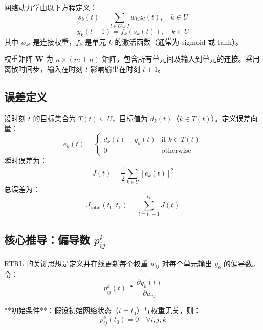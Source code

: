 \documentclass{article}
\begin{document}
网络动力学由以下方程定义：
\begin{equation}
s_k(t) = \sum_{l \in U \cup I} w_{kl} z_l(t), \quad k \in U
\label{eq:rtrl_net}
\end{equation}
\begin{equation}
y_k(t+1) = f_k(s_k(t)), \quad k \in U
\label{eq:rtrl_fire}
\end{equation}
其中 $w_{kl}$ 是连接权重，$f_k$ 是单元 $k$ 的激活函数（通常为 sigmoid 或 tanh）。

权重矩阵 $\mathbf{W}$ 为 $n \times (m+n)$ 矩阵，包含所有单元间及输入到单元的连接。采用离散时间步，输入在时刻 $t$ 影响输出在时刻 $t+1$。

\subsection{误差定义}

设时刻 $t$ 的目标集合为 $T(t) \subseteq U$，目标值为 $d_k(t)$（$k \in T(t)$）。定义误差向量：
\begin{equation}
e_k(t) = 
\begin{cases}
d_k(t) - y_k(t) & \text{if } k \in T(t) \\
0 & \text{otherwise}
\end{cases}
\label{eq:rtrl_error}
\end{equation}
瞬时误差为：
\begin{equation}
J(t) = \frac{1}{2} \sum_{k \in U} [e_k(t)]^2
\label{eq:rtrl_inst_loss}
\end{equation}
总误差为：
\begin{equation}
J_{\text{total}}(t_0, t_1) = \sum_{t = t_0+1}^{t_1} J(t)
\label{eq:rtrl_total_loss}
\end{equation}

\subsection{核心推导：偏导数 $p_{ij}^k$}

RTRL 的关键思想是定义并在线更新每个权重 $w_{ij}$ 对每个单元输出 $y_k$ 的偏导数。令：
\begin{equation}
p_{ij}^k(t) \triangleq \frac{\partial y_k(t)}{\partial w_{ij}}
\label{eq:rtrl_p_def}
\end{equation}

**初始条件**：假设初始网络状态（$t=t_0$）与权重无关，则：
\begin{equation}
p_{ij}^k(t_0) = 0 \quad \forall i,j,k
\label{eq:rtrl_p_init}
\end{equation}
\end{document}
